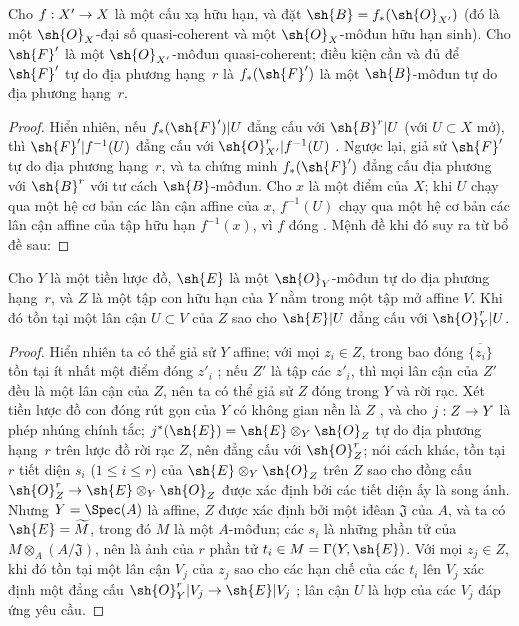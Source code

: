 \documentclass[oneside,10pt]{amsart}
\makeatletter
\renewcommand{\leq}{\leqslant}
\newcommand{\ega@arrow}[2]{\mathchoice{#1}{#2}{#2}{#2}}
\renewcommand{\to}{\ega@arrow{\longrightarrow}{\rightarrow}}
\newcommand{\oldpage}[2][]{\marginnote{\normalfont\footnotesize\textbf{#1}~|~#2}\ignorespaces}
\let\EGAOriginalLabel\label
\renewcommand{\label}[1]{\phantomsection\EGAOriginalLabel{#1}}
\makeatother
\begin{document}
\begin{proposition}[6.1.12]
\label{II.6.1.12}
Cho $f:X'\to X$ là một cấu xạ hữu hạn, và đặt $\sh{B}=f_*(\sh{O}_{X'})$ (đó là một $\sh{O}_X$-đại số quasi-coherent và một $\sh{O}_X$-môđun hữu hạn sinh).
Cho $\sh{F}'$ là một $\sh{O}_{X'}$-môđun quasi-coherent;
điều kiện cần và đủ để $\sh{F}'$ tự do địa phương hạng~$r$ là $f_*(\sh{F}')$ là một $\sh{B}$-môđun tự do địa phương hạng~$r$.
\end{proposition}

\begin{proof}
Hiển nhiên, nếu $f_*(\sh{F}')|U$ đẳng cấu với $\sh{B}^r|U$ (với $U\subset X$ mở), thì $\sh{F}'|f^{-1}(U)$ đẳng cấu với $\sh{O}_{X'}^r|f^{-1}(U)$ .
Ngược lại, giả sử $\sh{F}'$ tự do địa phương hạng~$r$, và ta chứng minh $f_*(\sh{F}')$ đẳng cấu địa phương với $\sh{B}^r$ với tư cách $\sh{B}$-môđun.
Cho $x$ là một điểm của $X$;
khi $U$ chạy qua một hệ cơ bản các lân cận affine của $x$, $f^{-1}(U)$ chạy qua một hệ cơ bản các lân cận affine  của tập hữu hạn $f^{-1}(x)$, vì $f$ đóng .
Mệnh đề khi đó suy ra từ bổ đề sau:
\end{proof}

\begin{lemma}[6.1.12.1]
\label{II.6.1.12.1}
Cho $Y$ là một tiền lược đồ, $\sh{E}$ là một $\sh{O}_Y$-môđun tự do địa phương hạng~$r$, và $Z$ là một tập con hữu hạn của $Y$ nằm trong một tập mở affine $V$.
Khi đó tồn tại một lân cận $U\subset V$ của $Z$ sao cho $\sh{E}|U$ đẳng cấu với $\sh{O}_Y^r|U$.
\end{lemma}

\begin{proof}
Hiển nhiên ta có thể giả sử $Y$ affine;
với mọi $z_i\in Z$, trong bao đóng $\overline{\{z_i\}}$ tồn tại ít nhất một điểm đóng $z'_i$ ;
nếu $Z'$ là tập các $z'_i$, thì mọi lân cận của $Z'$ đều là một lân cận của $Z$, nên ta có thể giả sử $Z$ đóng trong $Y$ và rời rạc.
Xét tiền lược đồ con đóng rút gọn của $Y$ có không gian nền là $Z$ , và cho $j:Z\to Y$ là phép nhúng chính tắc;
$j^*(\sh{E})=\sh{E}\otimes_Y\sh{O}_Z$ tự do địa phương hạng~$r$ trên lược đồ rời rạc $Z$, nên đẳng cấu với $\sh{O}_Z^r$;
nói cách khác, tồn tại $r$ tiết diện $s_i$ ($1\leq i\leq r$) của $\sh{E}\otimes_Y\sh{O}_Z$ trên $Z$ sao cho đồng cấu $\sh{O}_Z^r\to\sh{E}\otimes_Y\sh{O}_Z$ được xác định bởi các tiết diện ấy là song ánh.
Nhưng $Y=\Spec(A)$ là affine, $Z$ được xác định bởi một iđêan $\mathfrak{J}$ của $A$, và ta có $\sh{E}=\widetilde{M}$, trong đó $M$ là một $A$-môđun;
các $s_i$ là những phần tử của $M\otimes_A(A/\mathfrak{J})$, nên là ảnh của $r$ phần tử $t_i\in M=\Gamma(Y,\sh{E})$.
\oldpage[II]{114}
Với mọi $z_j\in Z$, khi đó tồn tại một lân cận $V_j$ của $z_j$ sao cho các hạn chế của các $t_i$ lên $V_j$ xác định một đẳng cấu $\sh{O}_Y^r|V_j\to\sh{E}|V_j$ ;
lân cận $U$ là hợp của các $V_j$ đáp ứng yêu cầu.
\end{proof}
\end{document}
